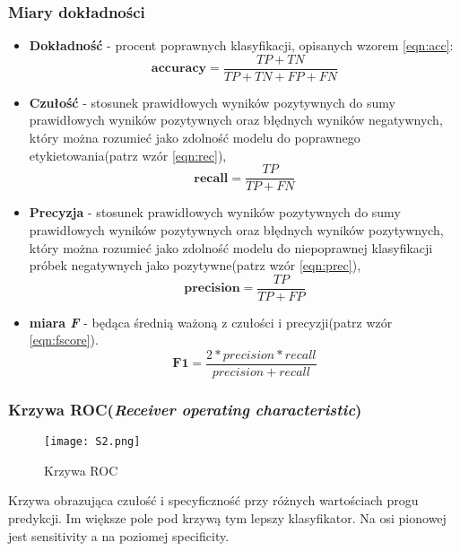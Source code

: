 \subsubsection{Miary dokładności}

\begin{itemize}
	\item \textbf{Dokładność} - procent poprawnych klasyfikacji, opisanych wzorem \ref{eqn:acc}:
	\begin{equation}
	\mathbf{accuracy} = \frac{TP + TN}{TP + TN + FP + FN}
	\label{eqn:acc}
	\end{equation}
	\item \textbf{Czułość} - stosunek prawidłowych wyników pozytywnych do sumy prawidłowych wyników pozytywnych oraz błędnych wyników negatywnych, który można rozumieć jako zdolność modelu do poprawnego etykietowania(patrz wzór \ref{eqn:rec}),
	\begin{equation}
	\mathbf{recall} = \frac{TP}{TP + FN}
	\label{eqn:rec}
	\end{equation}
	\item \textbf{Precyzja} - stosunek prawidłowych wyników pozytywnych do sumy prawidłowych wyników pozytywnych oraz błędnych wyników pozytywnych, który można rozumieć jako zdolność modelu do niepoprawnej klasyfikacji próbek negatywnych jako pozytywne(patrz wzór \ref{eqn:prec}),
	\begin{equation}
	\mathbf{precision} = \frac{TP}{TP + FP}
	\label{eqn:prec}
	\end{equation}
	\item \textbf{miara \textit{F}} - będąca średnią ważoną z czułości i precyzji(patrz wzór \ref{eqn:fscore}).
	\begin{equation}
	\mathbf{F1}= \frac{2 * precision * recall}{precision + recall}
	\label{eqn:fscore}
	\end{equation}
\end{itemize}

\subsubsection{Krzywa ROC(\textit{Receiver operating characteristic})}

\begin{figure}[H]
	\centering
	\texttt{[image: S2.png]}
	\caption{Krzywa ROC}
\end{figure}

Krzywa obrazująca czułość i specyficzność przy różnych wartościach progu predykcji. Im większe pole pod krzywą tym lepszy klasyfikator.  Na osi pionowej jest sensitivity a na poziomej specificity.

